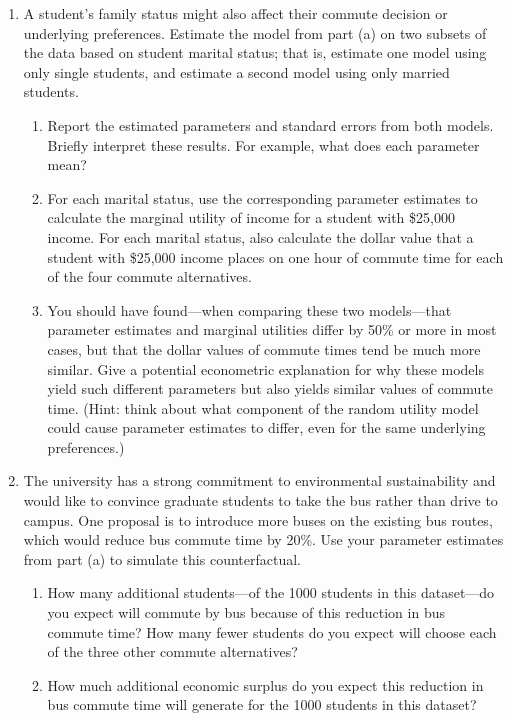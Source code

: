 \documentclass[11pt,letterpaper]{article}
\begin{document}
\begin{enumerate}[label=\alph*., leftmargin=*]
	\item A student's family status might also affect their commute decision or underlying preferences. Estimate the model from part (a) on two subsets of the data based on student marital status; that is, estimate one model using only single students, and estimate a second model using only married students.

	\begin{enumerate}[label=\roman*.]
		\item Report the estimated parameters and standard errors from both models. Briefly interpret these results. For example, what does each parameter mean?

		\item For each marital status, use the corresponding parameter estimates to calculate the marginal utility of income for a student with \$25,000 income. For each marital status, also calculate the dollar value that a student with \$25,000 income places on one hour of commute time for each of the four commute alternatives.

		\item You should have found---when comparing these two models---that parameter estimates and marginal utilities differ by 50\% or more in most cases, but that the dollar values of commute times tend be much more similar. Give a potential econometric explanation for why these models yield such different parameters but also yields similar values of commute time. (Hint: think about what component of the random utility model could cause parameter estimates to differ, even for the same underlying preferences.)
	\end{enumerate}

	\item The university has a strong commitment to environmental sustainability and would like to convince graduate students to take the bus rather than drive to campus. One proposal is to introduce more buses on the existing bus routes, which would reduce bus commute time by 20\%. Use your parameter estimates from part (a) to simulate this counterfactual.

	\begin{enumerate}[label=\roman*.]
		\item How many additional students---of the 1000 students in this dataset---do you expect will commute by bus because of this reduction in bus commute time? How many fewer students do you expect will choose each of the three other commute alternatives?

		\item How much additional economic surplus do you expect this reduction in bus commute time will generate for the 1000 students in this dataset?
	\end{enumerate}

\end{enumerate}
\end{document}
